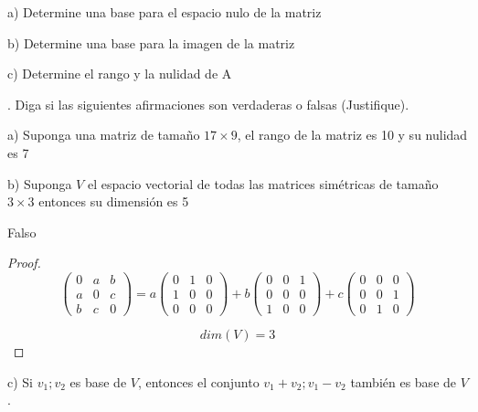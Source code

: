 \documentclass[12pt]{article}
\begin{document}
a) Determine una base para el espacio nulo de la matriz
\bigskip

b) Determine una base para la imagen de la matriz
\bigskip

c) Determine el rango y la nulidad de A
\bigskip

. Diga si las siguientes afirmaciones son verdaderas o falsas (Justifique).
\bigskip

a) Suponga una matriz de tamaño $17 \times 9$, el rango de la matriz es 10 y su nulidad es 7
\bigskip

b) Suponga $V$ el espacio vectorial de todas las matrices simétricas de tamaño $3 \times 3$ entonces su dimensión es 5
\bigskip

Falso
\begin{proof}
$$\begin{pmatrix} 0 & a & b\\ a & 0 & c\\ b & c & 0 \end{pmatrix} = a\begin{pmatrix} 0 & 1 & 0\\ 1 & 0 & 0\\ 0 & 0 & 0 \end{pmatrix} + b\begin{pmatrix} 0 & 0 & 1\\ 0 & 0 & 0\\ 1 & 0 & 0 \end{pmatrix} + c\begin{pmatrix} 0 & 0 & 0\\ 0 & 0 & 1\\ 0 & 1 & 0 \end{pmatrix}$$

$$dim(V) = 3$$
\end{proof}
\bigskip

c) Si $v_{1}; v_{2}$ es base de $V$, entonces el conjunto $v_{1} + v_{2}; v_{1} - v_{2}$ también es base de $V$.
\bigskip
\end{document}
